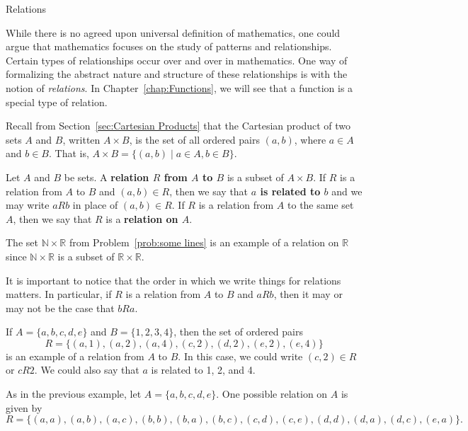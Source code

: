 \begin{section}{Relations}

While there is no agreed upon universal definition of mathematics, one could argue that mathematics focuses on the study of patterns and relationships. Certain types of relationships occur over and over in mathematics.  One way of formalizing the abstract nature and structure of these relationships is with the notion of \emph{relations}. In Chapter~\ref{chap:Functions}, we will see that a function is a special type of relation.

Recall from Section~\ref{sec:Cartesian Products} that the Cartesian product of two sets $A$ and $B$, written $A\times B$, is the set of all ordered pairs $(a,b)$, where $a\in A$ and $b\in B$. That is, $A\times B=\{(a,b)\mid a\in A, b\in B\}$.

\begin{definition}
Let $A$ and $B$ be sets. A \textbf{relation $R$ from $A$ to $B$} is a subset of $A \times B$. If $R$ is a relation from $A$ to $B$ and $(a,b)\in {R}$, then we say that \textbf{$a$ is related to $b$} and we may write $\boxed{aR b}$ in place of $(a,b)\in{R}$. If $R$ is a relation from $A$ to the same set $A$, then we say that $R$ is a \textbf{relation on $A$}.
\end{definition}

\begin{example}
The set $\mathbb{N}\times \mathbb{R}$ from Problem~\ref{prob:some lines} is an example of a relation on $\mathbb{R}$ since $\mathbb{N}\times \mathbb{R}$ is a subset of $\mathbb{R}\times \mathbb{R}$.
\end{example}

It is important to notice that the order in which we write things for relations matters.  In particular, if $R$ is a relation from $A$ to $B$ and $a R b$, then it may or may not be the case that $bR a$.

\begin{example}\label{ex:relation finite to finite}
If $A=\{a,b,c,d,e\}$ and $B=\{1,2,3,4\}$, then the set of ordered pairs
\[
R=\{(a,1),(a,2),(a,4),(c,2),(d,2),(e,2),(e,4)\}
\]
is an example of a relation from $A$ to $B$. In this case, we could write $(c,2)\in{R}$ or $cR 2$. We could also say that $a$ is related to 1, 2, and 4. 
\end{example}

\begin{example}\label{ex:relation on finite}
As in the previous example, let $A=\{a,b,c,d,e\}$. One possible relation on $A$ is given by
\[
R=\{(a,a),(a,b),(a,c),(b,b),(b,a),(b,c),(c,d),(c,e),(d,d),(d,a),(d,c),(e,a)\}.
\]
\end{example}


\end{section}
